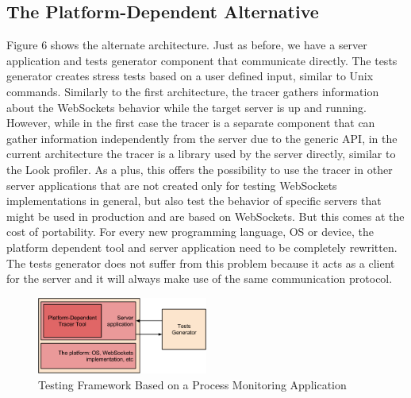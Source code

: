 \documentclass[conference]{IEEEtran}
\begin{document}
\subsection{The Platform-Dependent Alternative}
Figure 6 shows the alternate architecture. Just as before, we have a server
application and tests generator component that communicate directly. The tests
generator creates stress tests based on a user defined input, similar to Unix
commands. Similarly to the first architecture, the tracer gathers information
about the WebSockets behavior while the target server is up and running.
However, while in the first case the
tracer is a separate component that can gather information independently from
the server due to the generic API, in the current architecture the tracer is
a library used by the server directly, similar to the Look \cite{nodejs-look}
profiler. As a plus, this offers the possibility to use the tracer in other
server applications that are not created only for testing WebSockets
implementations in general, but also test the behavior of specific servers
that might be used in production and are based on WebSockets.
But this comes at the cost of portability.
For every new programming language, OS or device, the platform
dependent tool and server application need to be completely rewritten. The
tests generator does not suffer from this problem because it acts as a client
for the server and it will always make use of the same communication protocol.
\begin{frame}{}
  \begin{figure}
    \centering
    \includegraphics[width=0.5\textwidth]{img/architecture2.png}
    \caption{Testing Framework Based on a Process Monitoring Application}
  \end{figure}
\end{frame}
\\
\end{document}
